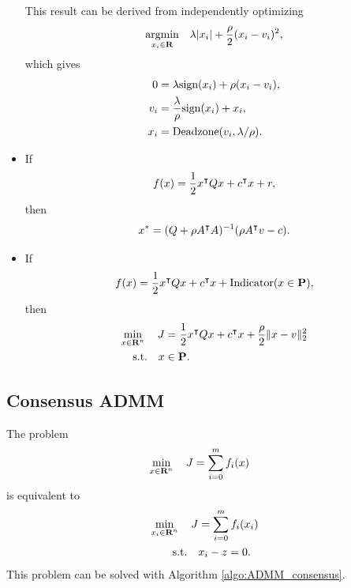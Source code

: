 \documentclass{article}
\begin{document}
\begin{itemize}
            This result can be derived from independently optimizing
            \begin{align*}
                \underset{x_i\in\textbf{R}}{\text{argmin}}\quad \lambda |x_i|+\frac{\rho}{2} (x_i-v_i)^2,
            \end{align*}
            which gives
            \begin{align*}
                0&=\lambda \text{sign}(x_i)+\rho(x_i-v_i),\\
                v_i &= \frac{\lambda}{\rho} \text{sign}(x_i)+x_i,\\
                x_i &= \text{Deadzone}(v_i,\lambda/\rho).
            \end{align*}
        \item If
            \begin{align*}
            f(x)=\frac{1}{2} x^\intercal Q x + c^\intercal x +r,
        \end{align*}
        then
            \begin{align*}
                x^*=(Q+\rho A^\intercal A)^{-1}(\rho A^\intercal v - c).
            \end{align*}
        \item If
            \begin{align*}
                f(x)=\frac{1}{2} x^\intercal Q x + c^\intercal x+\text{Indicator}(x\in\textbf{P}),
            \end{align*}
            then
            \begin{align*}
                \min_{x\in\textbf{R}^n}\quad J&=\frac{1}{2} x^\intercal Q x + c^\intercal x+\frac{\rho}{2}\|x-v\|_2^2\\
                \text{s.t.}\quad x&\in\textbf{P}.
            \end{align*}
    \end{itemize}

\clearpage
\subsection{Consensus ADMM}

    The problem
    \begin{align*}
        \min_{x\in\textbf{R}^n}\quad J&=\sum_{i=0}^m f_i(x)
    \end{align*}
    is equivalent to
    \begin{align}
        \min_{x_i\in\textbf{R}^n}\quad J&=\sum_{i=0}^m f_i(x_i)\\
        \text{s.t.}\quad &x_i-z=0.\nonumber
    \end{align}
    This problem can be solved with Algorithm \ref{algo:ADMM_consensus}.
\end{document}
